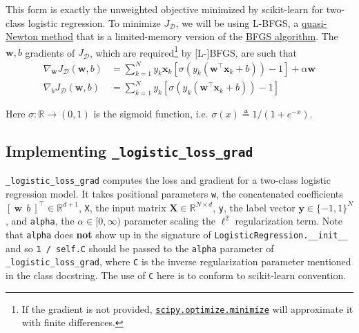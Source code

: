 \documentclass{article}
\numberwithin{equation}{section}
\newcommand{\minimize}{%
    \href{%
        https://docs.scipy.org/doc/scipy/reference/generated/%
        scipy.optimize.minimize.html%
    }{\texttt{scipy.optimize.minimize}}%
}
\newcommand{\loglossgrad}{\texttt{\_logistic\_loss\_grad}}
\begin{document}
This form is exactly the unweighted objective minimized by scikit-learn for
two-class logistic regression. To minimize $ J_\mathcal{D} $, we will be using
L-BFGS, a \href{%
    https://en.wikipedia.org/wiki/Quasi-Newton_method%
}{quasi-Newton method} that is a limited-memory version of the \href{%
    https://en.wikipedia.org/wiki/Broyden\%E2\%80\%93Fletcher\%E2\%80\%93%
    Goldfarb\%E2\%80\%93Shanno_algorithm%
}{BFGS algorithm}. The $ \mathbf{w}, b $ gradients of $ J_\mathcal{D} $, which
are required\footnote{
    If the gradient is not provided, \minimize{} will approximate it with
    finite differences.
} by [L-]BFGS, are such that
\begin{equation} \label{logreg_grads}
    \begin{split}
        \nabla_\mathbf{w}J_\mathcal{D}(\mathbf{w}, b) & =
	    \sum_{k = 1}^N y_k\mathbf{x}_k\left[
	        \sigma\left(
	            y_k\left(\mathbf{w}^\top\mathbf{x}_k + b\right)
	        \right) - 1
	    \right] + \alpha\mathbf{w} \\
	    \nabla_bJ_\mathcal{D}(\mathbf{w}, b) & =
	    \sum_{k = 1}^N y_k\left[
	        \sigma\left(
	            y_k\left(\mathbf{w}^\top\mathbf{x}_k + b\right)
	        \right) - 1
	    \right]
    \end{split}
\end{equation}

Here $ \sigma : \mathbb{R} \rightarrow (0, 1) $ is the sigmoid function, i.e.
$ \sigma(x) \triangleq 1 / (1 + e^{-x}) $.

\subsection{Implementing \loglossgrad}

\loglossgrad{} computes the loss and gradient for a two-class logistic
regression model. It takes positional parameters \texttt{w}, the concatenated 
coefficients $ [ \ \mathbf{w} \ \ b \ ]^\top \in \mathbb{R}^{d + 1} $,
\texttt{X}, the input matrix $ \mathbf{X} \in \mathbb{R}^{N \times d} $,
\texttt{y}, the label vector $ \mathbf{y} \in \{-1, 1\}^N $, and
\texttt{alpha}, the $ \alpha \in [0, \infty) $ parameter scaling the
$ \ell^2 $ regularization term. Note that \texttt{alpha} does \textbf{not}
show up in the signature of \texttt{LogisticRegression.\_\_init\_\_} and so
\texttt{1 / self.C} should be passed to the \texttt{alpha} parameter of
\loglossgrad, where \texttt{C} is the inverse regularization parameter
mentioned in the class docstring. The use of \texttt{C} here is to conform to
scikit-learn convention.
\end{document}
